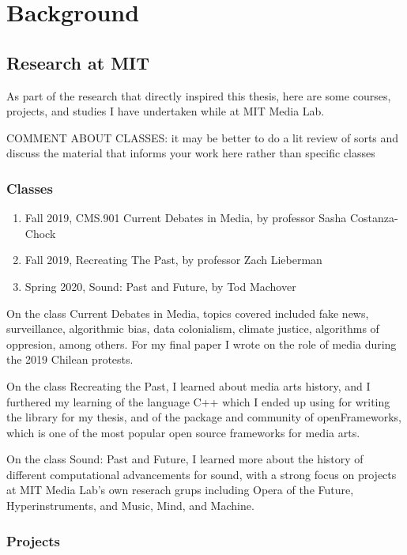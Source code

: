 \chapter{Background}

\section{Research at MIT}

As part of the research that directly inspired this thesis, here are some courses, projects, and studies I have undertaken while at MIT Media Lab.

COMMENT ABOUT CLASSES: it may be better to do a lit review of sorts and discuss the material that informs your work here rather than specific classes

\subsection{Classes}

\begin{enumerate}
  \item Fall 2019, CMS.901 Current Debates in Media, by professor Sasha Costanza-Chock
  \item Fall 2019, Recreating The Past, by professor Zach Lieberman
  \item Spring 2020, Sound: Past and Future, by Tod Machover
\end{enumerate}

On the class Current Debates in Media, topics covered included fake news, surveillance, algorithmic bias, data colonialism, climate justice, algorithms of oppresion, among others. For my final paper I wrote on the role of media during the 2019 Chilean protests.

On the class Recreating the Past, I learned about media arts history, and I furthered my learning of the language C++ which I ended up using for writing the library for my thesis, and of the package and community of openFrameworks, which is one of the most popular open source frameworks for media arts.

On the class Sound: Past and Future, I learned more about the history of different computational advancements for sound, with a strong focus on projects at MIT Media Lab's own reserach grups including Opera of the Future, Hyperinstruments, and Music, Mind, and Machine.

\subsection{Projects}

